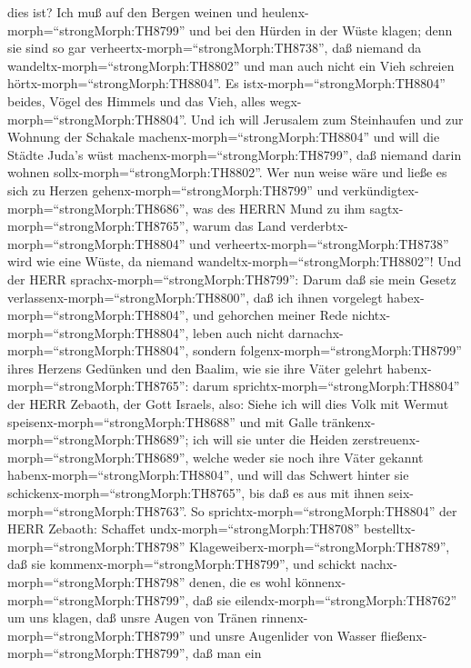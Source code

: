 dies ist?  Ich muß auf den Bergen weinen und
heulenx-morph=``strongMorph:TH8799'' und bei den Hürden in der Wüste
klagen; denn sie sind so gar verheertx-morph=``strongMorph:TH8738'', daß
niemand da wandeltx-morph=``strongMorph:TH8802'' und man auch nicht ein
Vieh schreien hörtx-morph=``strongMorph:TH8804''. Es
istx-morph=``strongMorph:TH8804'' beides, Vögel des Himmels und das
Vieh, alles wegx-morph=``strongMorph:TH8804''.  Und ich
will Jerusalem zum Steinhaufen und zur Wohnung der Schakale
machenx-morph=``strongMorph:TH8804'' und will die Städte Juda's wüst
machenx-morph=``strongMorph:TH8799'', daß niemand darin wohnen
sollx-morph=``strongMorph:TH8802''.  Wer nun weise wäre und
ließe es sich zu Herzen gehenx-morph=``strongMorph:TH8799'' und
verkündigtex-morph=``strongMorph:TH8686'', was des HERRN Mund zu ihm
sagtx-morph=``strongMorph:TH8765'', warum das Land
verderbtx-morph=``strongMorph:TH8804'' und
verheertx-morph=``strongMorph:TH8738'' wird wie eine Wüste, da niemand
wandeltx-morph=``strongMorph:TH8802''!  Und der HERR
sprachx-morph=``strongMorph:TH8799'': Darum daß sie mein Gesetz
verlassenx-morph=``strongMorph:TH8800'', daß ich ihnen vorgelegt
habex-morph=``strongMorph:TH8804'', und gehorchen meiner Rede
nichtx-morph=``strongMorph:TH8804'', leben auch nicht
darnachx-morph=``strongMorph:TH8804'',  sondern
folgenx-morph=``strongMorph:TH8799'' ihres Herzens Gedünken und den
Baalim, wie sie ihre Väter gelehrt habenx-morph=``strongMorph:TH8765'':
 darum sprichtx-morph=``strongMorph:TH8804'' der HERR
Zebaoth, der Gott Israels, also: Siehe ich will dies Volk mit Wermut
speisenx-morph=``strongMorph:TH8688'' und mit Galle
tränkenx-morph=``strongMorph:TH8689'';  ich will sie unter
die Heiden zerstreuenx-morph=``strongMorph:TH8689'', welche weder sie
noch ihre Väter gekannt habenx-morph=``strongMorph:TH8804'', und will
das Schwert hinter sie schickenx-morph=``strongMorph:TH8765'', bis daß
es aus mit ihnen seix-morph=``strongMorph:TH8763''.  So
sprichtx-morph=``strongMorph:TH8804'' der HERR Zebaoth: Schaffet
undx-morph=``strongMorph:TH8708'' bestelltx-morph=``strongMorph:TH8798''
Klageweiberx-morph=``strongMorph:TH8789'', daß sie
kommenx-morph=``strongMorph:TH8799'', und schickt
nachx-morph=``strongMorph:TH8798'' denen, die es wohl
könnenx-morph=``strongMorph:TH8799'',  daß sie
eilendx-morph=``strongMorph:TH8762'' um uns klagen, daß unsre Augen von
Tränen rinnenx-morph=``strongMorph:TH8799'' und unsre Augenlider von
Wasser fließenx-morph=``strongMorph:TH8799'',  daß man ein
